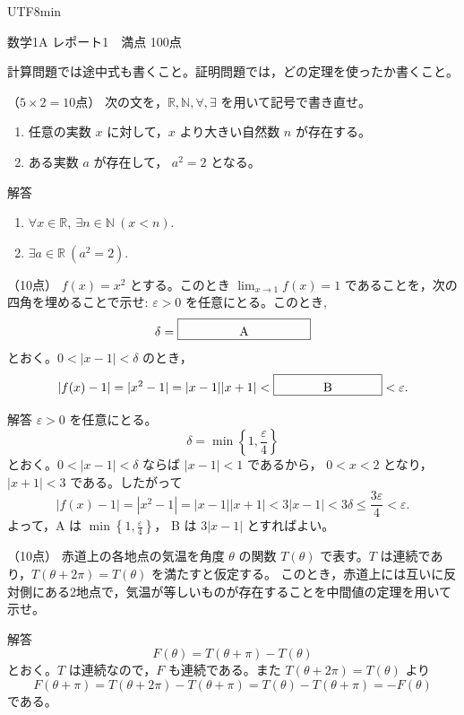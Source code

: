 \documentclass[a4paper,12pt]{article}
\newcommand{\blankbox}[2]{\fbox{\rule{0pt}{2.4ex}\makebox[#1]{#2}}}
\newcommand{\problem}[2]{\par\vspace{0.9em}\noindent{\large 問題 #1}\quad（#2点）\quad\ignorespaces}
\newcommand{\answer}{\par\noindent 解答\quad}
\begin{document}
\ifPDFTeX
\begin{CJK}{UTF8}{min}
\fi

\begin{center}
{\Large 数学1A レポート1}　満点 100点
\end{center}

計算問題では途中式も書くこと。証明問題では，どの定理を使ったか書くこと。

\problem{1}{$5\times 2=10$}
次の文を，$\mathbb{R},\mathbb{N},\forall,\exists$ を用いて記号で書き直せ。

\begin{enumerate}[label=(\alph*)]
\item 任意の実数 $x$ に対して，$x$ より大きい自然数 $n$ が存在する。 
\item ある実数 $a$ が存在して， $a^2 = 2 $ となる。 
\end{enumerate}

\answer
\begin{enumerate}[label=(\alph*)]
\item $\forall x\in\mathbb{R},\ \exists n\in\mathbb{N}\ (x<n).$
\item $\exists a\in\mathbb{R}\ (a^2=2).$
\end{enumerate}

\problem{2}{10}
$f(x)=x^2$ とする。このとき
\(
\lim_{x\to 1} f(x)=1
\) 
であることを，次の四角を埋めることで示せ:  $\varepsilon>0$ を任意にとる。このとき, 
\[
\delta=\blankbox{10em}{A}
\]
とおく。$0<|x-1|<\delta$ のとき，
\[
|f(x)-1|
=|x^2-1|
=|x-1||x+1|
<\blankbox{8em}{B}
<\varepsilon.
\]

\answer
$\varepsilon>0$ を任意にとる。
\[
\delta=\min\left\{1,\frac{\varepsilon}{4}\right\}
\]
とおく。$0<|x-1|<\delta$ ならば $|x-1|<1$ であるから，
$0<x<2$ となり，$|x+1|<3$ である。したがって
\[
|f(x)-1|
=|x^2-1|
=|x-1||x+1|
<3|x-1|
<3\delta
\leq \frac{3\varepsilon}{4}
<\varepsilon.
\]
よって，A は $\displaystyle \min\left\{1,\frac{\varepsilon}{4}\right\}$，
B は $3|x-1|$ とすればよい。

\problem{3}{10}
赤道上の各地点の気温を角度 $\theta$ の関数 $T(\theta)$ で表す。$T$ は連続であり，$T(\theta+2\pi)=T(\theta)$ を満たすと仮定する。 このとき，赤道上には互いに反対側にある2地点で，気温が等しいものが存在することを中間値の定理を用いて示せ。

\answer
\[
F(\theta)=T(\theta+\pi)-T(\theta)
\]
とおく。$T$ は連続なので，$F$ も連続である。また $T(\theta+2\pi)=T(\theta)$ より
\[
F(\theta+\pi)=T(\theta+2\pi)-T(\theta+\pi)
=T(\theta)-T(\theta+\pi)
=-F(\theta)
\]
である。


\end{CJK}
\end{document}

